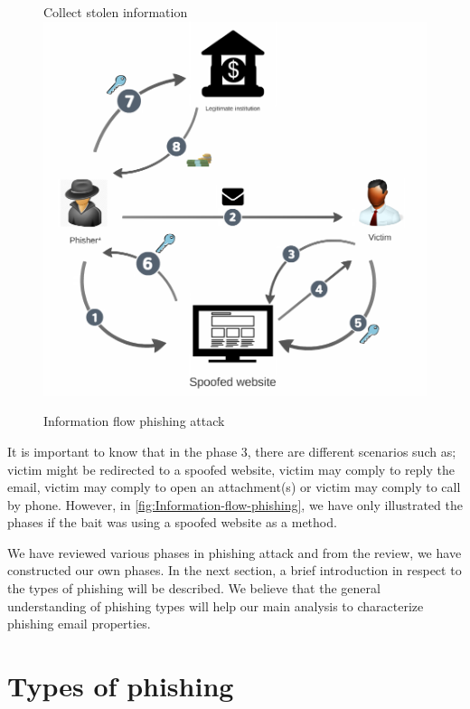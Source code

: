 \begin{figure}
\centering{}Collect stolen information \includegraphics[scale=0.3]{gfx/info-flow-nolie}\protect\caption{\label{fig:Information-flow-phishing}Information flow phishing attack}
\end{figure}


It is important to know that in the phase 3, there are different scenarios
such as; victim might be redirected to a spoofed website, victim may
comply to reply the email, victim may comply to open an attachment(s)
or victim may comply to call by phone. However, in \autoref{fig:Information-flow-phishing},
we have only illustrated the phases if the bait was using a spoofed
website as a method. 

We have reviewed various phases in phishing attack and from the review,
we have constructed our own phases. In the next section, a brief introduction
in respect to the types of phishing will be described. We believe
that the general understanding of phishing types will help our main
analysis to characterize phishing email properties.


\section{Types of phishing}

